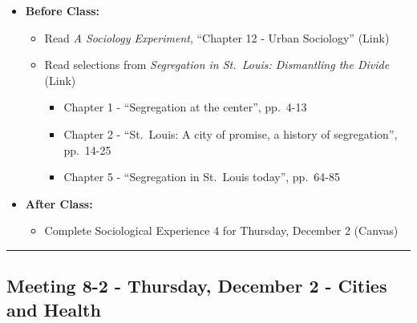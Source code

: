 \documentclass[
]{book}
\providecommand{\tightlist}{%
  \setlength{\itemsep}{0pt}\setlength{\parskip}{0pt}}
\begin{document}
\begin{itemize}
\tightlist
\item
  \textbf{Before Class:}

  \begin{itemize}
  \tightlist
  \item
    Read \emph{A Sociology Experiment}, ``Chapter 12 - Urban Sociology'' (Link)
  \item
    Read selections from \emph{Segregation in St.~Louis: Dismantling the Divide} (Link)

    \begin{itemize}
    \tightlist
    \item
      Chapter 1 - ``Segregation at the center'', pp.~4-13
    \item
      Chapter 2 - ``St.~Louis: A city of promise, a history of segregation'', pp.~14-25
    \item
      Chapter 5 - ``Segregation in St.~Louis today'', pp.~64-85
    \end{itemize}
  \end{itemize}
\item
  \textbf{After Class:}

  \begin{itemize}
  \tightlist
  \item
    Complete Sociological Experience 4 for Thursday, December 2 (Canvas)
  \end{itemize}
\end{itemize}

\begin{center}\rule{0.5\linewidth}{0.5pt}\end{center}

\hypertarget{meeting-8-2---thursday-december-2---cities-and-health}{%
\subsection*{Meeting 8-2 - Thursday, December 2 - Cities and Health}\label{meeting-8-2---thursday-december-2---cities-and-health}}
\end{document}
